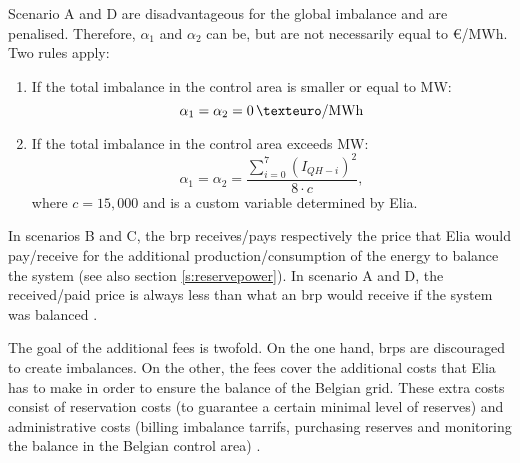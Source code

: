 Scenario A and D are disadvantageous for the global imbalance and are penalised. Therefore, $\alpha_1$ and $\alpha_2$ can be, but are not necessarily equal to \unit[0]{\euro /MWh}. Two rules apply:
\begin{enumerate}
\item If the total imbalance in the control area is smaller or equal to \unit[140]{MW}:
  \begin{equation}
    \alpha_1 = \alpha_2 = \unit[0]{\texteuro /MWh}
  \end{equation}
\item If the total imbalance in the control area exceeds \unit[140]{MW}:
  \begin{equation}
     \alpha_1 = \alpha_2 = \frac{\sum_{i=0}^{7}{(I_{\mathit{QH}-i})^2}}{8 \cdot c},
  \end{equation}
where $c = 15,000$ and is a custom variable determined by Elia.
\end{enumerate}
In scenarios B and C, the \gls{brp} receives/pays respectively the price that Elia would pay/receive for the additional production/consumption of the energy to balance the system (see also section \ref{s:reservepower}). In scenario A and D, the received/paid price is always less than what an \gls{brp} would receive if the system was balanced \cite{EliaIT}.

The goal of the additional fees is twofold. On the one hand, \glspl{brp} are discouraged to create imbalances. On the other, the fees cover the additional costs that Elia has to make in order to ensure the balance of the Belgian grid. These extra costs consist of reservation costs (to guarantee a certain minimal level of reserves) and administrative costs (billing imbalance tarrifs, purchasing reserves and monitoring the balance in the Belgian control area) \cite{EliaIT}.

